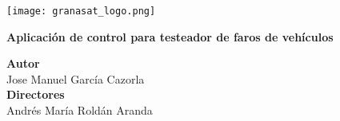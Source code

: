 \begin{titlepage}
    \setlength{\centeroffset}{-0.5\oddsidemargin}
    \addtolength{\centeroffset}{0.5\evensidemargin}
    \thispagestyle{empty}

    \noindent\hspace*{\centeroffset}

    \begin{minipage}{\textwidth}
        \centering
        \vspace{3.3cm}

        \texttt{[image: granasat\_logo.png]}
        \vspace{0.5cm}

        \Huge\bfseries Aplicación de control para testeador de faros de vehículos
    \end{minipage}

    \vspace{2.5cm}
    \noindent\hspace*{\centeroffset}

    \begin{minipage}{\textwidth}
        \centering

        \textbf{Autor}\\{Jose Manuel García Cazorla}\\[2.5ex]
        \textbf{Directores}\\{Andrés María Roldán Aranda}\\[2cm]
    \end{minipage}

\end{titlepage}
